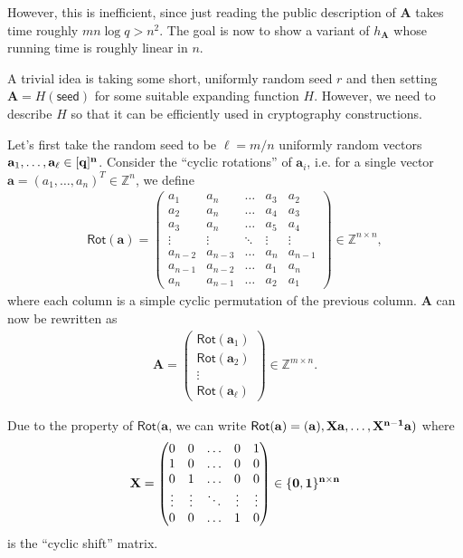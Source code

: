 \documentclass[cryptography,review,submit,pdftex,moreauthors,amsmath,amssymb,aps,strict]{Definitions/mdpi}
\begin{document}
However, this is inefficient, since just reading the public description of $\mathbf{A}$ takes time roughly $mn\log q>n^2$. The goal is now to show a variant of $h_{\mathbf{A}}$ whose running time is roughly linear in $n$. 

A trivial idea is taking some short, uniformly random seed $r$ and then setting $\mathbf{A} = H(\textsf{seed})$ for some suitable expanding function $H$. However, we need to describe $H$ so that it can be efficiently used in cryptography constructions. 


Let's first take the random seed to be $\ell = m/n$ uniformly random vectors $\mathbf{a}_1,\dots,\bf{a_{\ell}}\in[q]^n$. Consider the ``cyclic rotations'' of $\mathbf{a}_i$, i.e. for a single vector $\mathbf{a}=(a_1,\dots,a_n)^T\in\mathbb{Z}^n$, we define
\begin{align}
    \mathsf{Rot}(\mathbf{a})=
    \begin{pmatrix}
    a_1 & a_n &\dots& a_3 & a_2\\
    a_2 & a_n &\dots& a_4 & a_3\\
    a_3 & a_n &\dots& a_5 & a_4\\
    \vdots & \vdots &\ddots& \vdots & \vdots\\
    a_{n-2} & a_{n-3} &\dots& a_n & a_{n-1}\\
    a_{n-1} & a_{n-2} &\dots& a_1 & a_n\\
    a_{n} & a_{n-1} &\dots& a_2 & a_1
    \end{pmatrix}\in\mathbb{Z}^{n\times n},
\end{align}
    where each column is a simple cyclic permutation of the previous column. 
    $\mathbf{A}$ can now be rewritten as
\begin{align}
    \mathbf{A}=
    \begin{pmatrix}
    \mathsf{Rot}(\mathbf{a}_1)\\
    \mathsf{Rot}(\mathbf{a}_2)\\
    \vdots\\
    \mathsf{Rot}(\mathbf{a}_{\ell})
    \end{pmatrix}\in\mathbb{Z}^{m\times n}.
\end{align}

\noindent Due to the property of $\mathsf{Rot}(\mathbf{a}$, we can write $\mathsf{Rot}(\mathbf{a})=(\mathbf{a}),\bf{X}\mathbf{a},\dots,X^{n-1}\mathbf{a})$ 
where 
\begin{align}
    \bf{X}=
    \begin{pmatrix}
    0 & 0 &\dots& 0 & 1\\
    1 & 0 &\dots& 0 & 0\\
    0 & 1 &\dots& 0 & 0\\
    \vdots & \vdots &\ddots& \vdots & \vdots\\
    0 & 0 &\dots& 1 & 0
    \end{pmatrix}\in\{0,1\}^{n\times n}
\end{align}
    is the ``cyclic shift'' matrix. 
   
\end{document}
